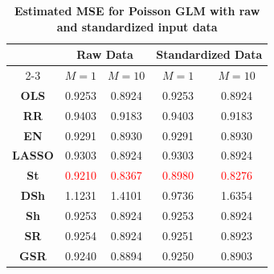 \begin{table}[htbp!]
\centering
\caption{\textbf{Estimated MSE for Poisson GLM with raw and standardized input data}}
\label{tab:results_Poisson_log_regression_raw_data}
\setlength{\tabcolsep}{8pt}
\renewcommand{\arraystretch}{1}
\footnotesize{
\begin{tabular*}{\textwidth}{@{\extracolsep{\fill}}ccccc@{}}
\toprule
 & \multicolumn{2}{c}{\textbf{Raw Data}} & \multicolumn{2}{c}{\textbf{Standardized Data}}\\
 \cmidrule{2-3} \cmidrule{4-5}
\multirow{-2}{*}{\textbf{Model}} & $M=1$ & $M=10$ & $M=1$ & $M=10$ \\
\midrule
\textbf{OLS} & 0.9253 & 0.8924 & 0.9253 & 0.8924 \\
\textbf{RR} & 0.9403 & 0.9183 & 0.9403 & 0.9183 \\
\textbf{EN} & 0.9291 & 0.8930 & 0.9291 & 0.8930 \\
\textbf{LASSO} & 0.9303 & 0.8924 & 0.9303 & 0.8924 \\
\textbf{St} & \textcolor{red}{0.9210} & \textcolor{red}{0.8367} & \textcolor{red}{0.8980} & \textcolor{red}{0.8276} \\
\textbf{DSh} & 1.1231 & 1.4101 & 0.9736 & 1.6354 \\
\textbf{Sh} & 0.9253 & 0.8924 & 0.9253 & 0.8924 \\
\textbf{SR} & 0.9254 & 0.8924 & 0.9251 & 0.8923 \\
\textbf{GSR} & 0.9240 & 0.8894 & 0.9250 & 0.8903 \\
\bottomrule
\end{tabular*}
}
\end{table}
